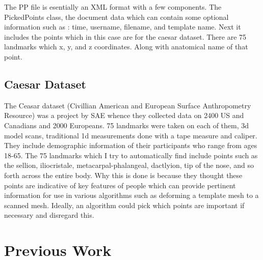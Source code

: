 The PP file is esentially an XML format with a few components. The PickedPoints class, the document data which can contain some optional information such as : time, username, filename, and template name. Next it includes the points which in this case are for the caesar dataset. There are 75 landmarks which x, y, and z coordinates. Along with anatomical name of that point.

\section{Caesar Dataset}
The Ceasar dataset (Civillian American and European Surface Anthropometry Resource) was a project by SAE whence they collected data on 2400 US and Canadians and 2000 Europeans. 75 landmarks were taken on each of them, 3d model scans, traditional 1d measurements done with a tape measure and caliper. They include demographic information of their participants who range from ages 18-65. The 75 landmarks which I try to automatically find include points such as the sellion, iliocristale, metacarpal-phalangeal, dactlyion, tip of the nose, and so forth across the entire body. Why this is done is because they thought these points are indicative of key features of people which can provide pertinent information for use in various algorithms such as deforming a template mesh to a scanned mesh. Ideally, an algorithm could pick which points are important if necessary and disregard this.

\chapter{Previous Work}

